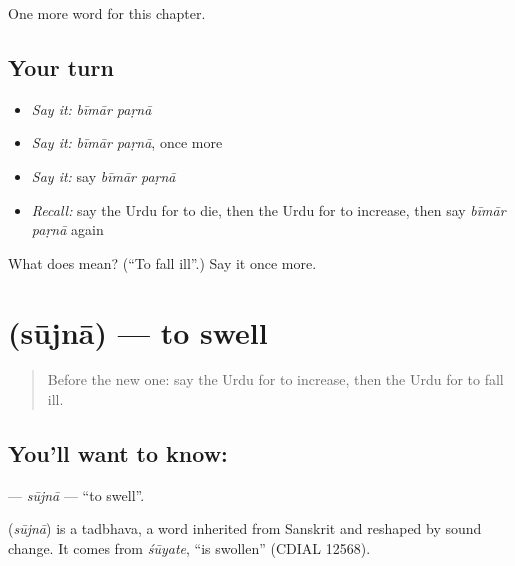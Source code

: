 \begin{grammarlens}[title={What you've built}]
One more word for this chapter.
\end{grammarlens}

\subsection*{Your turn}
\begin{itemize}
\raggedright
  \item \emph{Say it:} \emph{bīmār paṛnā}
  \item \emph{Say it:} \emph{bīmār paṛnā}, once more
  \item \emph{Say it:} say \emph{bīmār paṛnā}
  \item \emph{Recall:} say the Urdu for to die, then the Urdu for to increase, then say \emph{bīmār paṛnā} again
\end{itemize}

\begin{tcolorbox}[breakable,colback=teal!4,colframe=teal!35!black,title={Before you move on}]
What does   mean? (\textquotedblleft{}To fall ill\textquotedblright{}.) Say it once more.
\end{tcolorbox}
\section[\texorpdfstring{\ur{سوجنا} (sūjnā)}{سوجنا (sūjnā)}]{ (sūjnā) — to swell}

\label{lesson:UR-C184-sujna}



\begin{quote}
Before the new one: say the Urdu for to increase, then the Urdu for to fall ill.
\end{quote}

\subsection*{You'll want to know: }
\textbf{} — \emph{sūjnā} — \textquotedblleft{}to swell\textquotedblright{}.

\begin{cousinweb}
\textbf{} (\emph{sūjnā}) is a tadbhava, a word inherited from Sanskrit and reshaped by sound change. It comes from \emph{śūyate}, \textquotedblleft{}is swollen\textquotedblright{} (CDIAL 12568).
\end{cousinweb}

